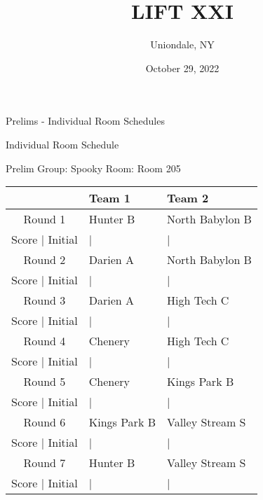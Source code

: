 \documentclass{article}%
\title{LIFT XXI}%
\author{Uniondale, NY}%
\date{October 29, 2022}%
\begin{document}
%
\normalsize%
%
\maketitle%
\vspace*{48pt}%
\begin{center}%
\begin{Huge}%
Prelims {-} Individual Room Schedules%
\end{Huge}%
\end{center}%
\newpage%
\pagestyle{fancy}%
\fancyhf{}%
%
%
%
\begin{center}%
\begin{Huge}%
Individual Room Schedule%
\end{Huge}%
\vspace*{16pt}%
\linebreak%
\begin{Large}%
Prelim Group: Spooky \hfill Room: Room 205%
\end{Large}%
\end{center}%
%
\begin{tabularx}{\textwidth}{|c|Y|Y|}%
\hline%
&Team 1&Team 2\\%
\hline%
Round 1&Hunter B&North Babylon B\\%
\hline%
Score | Initial&|&|\\%
\hline%
Round 2&Darien A&North Babylon B\\%
\hline%
Score | Initial&|&|\\%
\hline%
Round 3&Darien A&High Tech C\\%
\hline%
Score | Initial&|&|\\%
\hline%
Round 4&Chenery&High Tech C\\%
\hline%
Score | Initial&|&|\\%
\hline%
Round 5&Chenery&Kings Park B\\%
\hline%
Score | Initial&|&|\\%
\hline%
Round 6&Kings Park B&Valley Stream S\\%
\hline%
Score | Initial&|&|\\%
\hline%
Round 7&Hunter B&Valley Stream S\\%
\hline%
Score | Initial&|&|\\%
\hline%
\end{tabularx}%
\vspace*{16pt}%
\linebreak%
\end{document}

